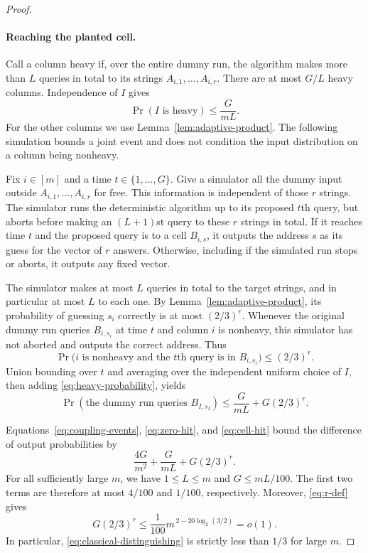 \documentclass[11pt]{article}
\theoremstyle{definition}
\begin{document}
\begin{proof}
\paragraph{Reaching the planted cell.}
Call a column heavy if, over the entire dummy run, the algorithm makes
more than $L$ queries in total to its strings $A_{i,1},\ldots,A_{i,r}$.
There are at most $G/L$ heavy columns.  Independence of $I$ gives
\begin{equation}\label{eq:heavy-probability}
 \Pr(I\text{ is heavy})\leq\frac{G}{mL}.
\end{equation}
For the other columns we use Lemma~\ref{lem:adaptive-product}.  The
following simulation bounds a joint event and does not condition the
input distribution on a column being nonheavy.

Fix $i\in[m]$ and a time $t\in\{1,\ldots,G\}$.  Give a simulator all
the dummy input outside $A_{i,1},\ldots,A_{i,r}$ for free.  This
information is independent of those $r$ strings.  The simulator runs
the deterministic algorithm up to its proposed $t$th query, but aborts
before making an $(L+1)$st query to these $r$ strings in total.  If it
reaches time $t$ and the proposed query is to a cell $B_{i,s}$, it outputs
the address $s$ as its guess for the vector of $r$ answers.  Otherwise,
including if the simulated run stops or aborts, it outputs any fixed
vector.

The simulator makes at most $L$ queries in total to the target strings,
and in particular at most $L$ to each one.  By
Lemma~\ref{lem:adaptive-product}, its probability of guessing $s_i$
correctly is at most $(2/3)^r$.  Whenever the original dummy run queries
$B_{i,s_i}$ at time $t$ and column $i$ is nonheavy, this simulator has
not aborted and outputs the correct address.  Thus
\begin{equation}\label{eq:capped-address}
 \Pr\bigl(i\text{ is nonheavy and the $t$th query is in }B_{i,s_i}\bigr)
 \leq (2/3)^r.
\end{equation}
Union bounding over $t$ and averaging over the independent uniform
choice of $I$, then adding \eqref{eq:heavy-probability}, yields
\begin{equation}\label{eq:cell-hit}
 \Pr(\text{the dummy run queries }B_{I,s_I})
 \leq\frac{G}{mL}+G(2/3)^r.
\end{equation}

Equations~\eqref{eq:coupling-events}, \eqref{eq:zero-hit}, and
\eqref{eq:cell-hit} bound the difference of output probabilities by
\begin{equation}\label{eq:classical-distinguishing}
 \frac{4G}{m^2}+\frac{G}{mL}+G(2/3)^r.
\end{equation}
For all sufficiently large $m$, we have $1\leq L\leq m$ and
$G\leq mL/100$.  The first two terms are therefore at most $4/100$
and $1/100$, respectively.  Moreover, \eqref{eq:r-def} gives
\[
 G(2/3)^r
 \leq\frac1{100}m^{\,2-20\log_2(3/2)}=o(1).
\]
In particular, \eqref{eq:classical-distinguishing} is strictly less
than $1/3$ for large $m$.


\end{proof}
\end{document}
